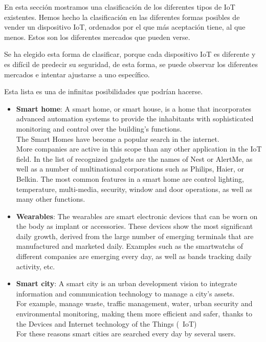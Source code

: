 
En esta sección mostramos una clasificación de los diferentes tipos de IoT existentes. Hemos hecho la clasificación en las diferentes formas posibles de vender un dispositivo IoT, ordenados por el que más aceptación tiene, al que menos. Estos son los diferentes mercados que pueden verse.

Se ha elegido esta forma de clasificar, porque cada dispositivo IoT es diferente y es difícil de predecir su seguridad, de esta forma, se puede observar los diferentes mercados e intentar ajustarse a uno específico.

Esta lista es una de infinitas posibilidades que podrían hacerse.

\begin{itemize}
	\item \textbf{Smart home}: A smart home, or smart house, is a home that incorporates advanced automation systems to provide the inhabitants with sophisticated monitoring and control over the building's functions.\\ The Smart Homes have become a popular search in the internet.\\ More companies are active in this scope than any other application in the IoT field. In the list of recognized gadgets are the names of Nest or AlertMe, as well as a number of multinational corporations such as Philips, Haier, or Belkin. The most common features in a smart home are control lighting, temperature, multi-media, security, window and door operations, as well as many other functions.

	\item \textbf{Wearables}: The wearables are smart electronic devices that can be worn on the body as implant or accessories. These devices show the most significant daily growth, derived from the large number of emerging terminals that are manufactured and marketed daily. Examples such as the smartwatchs of different companies are emerging every day, as well as bands tracking daily activity, etc.

	\item \textbf{Smart city}: A smart city is an urban development vision to integrate information and communication technology to manage a city's assets.\\ For example, manage waste, traffic management, water, urban security and environmental monitoring, making them more efficient and safer, thanks to the Devices and Internet technology of the Things (\ IoT)\\ For these reasons smart cities are searched every day by several users.


\end{itemize}
